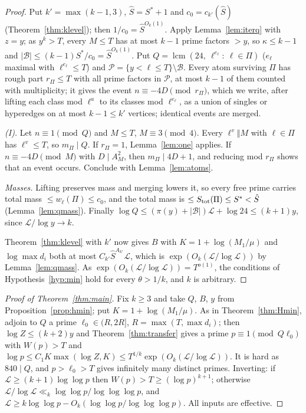 \documentclass[11pt,reqno]{amsart}
\theoremstyle{definition}
\newcommand{\lcm}{\operatorname{lcm}}
\newcommand{\Lc}{\mathcal L}
\begin{document}
\begin{proof}
Put $k'=\max(k-1,3)$, $\hat S=S^*+1$ and $c_0=c_{k'}(\hat S)$
(Theorem~\ref{thm:klevel}); then $1/c_0=\hat S^{O_k(1)}$.  Apply
Lemma~\ref{lem:iterq} with $z=y$; as $y^k>T$, every $M\le T$ has at most $k-1$
prime factors $>y$, so $\kappa\le k-1$ and $|\mathcal B|\le(k-1)S^*/c_0=\hat
S^{O_k(1)}$.  Put $Q=\lcm(24,\ \ell^{e_\ell}:\ \ell\in\Pi)$ ($e_\ell$ maximal with
$\ell^{e_\ell}\le T$) and $\mathcal P=\{y<\ell\le T\}\setminus\mathcal B$.  Every atom
surviving $\Pi$ has rough part $r_\Pi\le T$ with all prime factors in $\mathcal P$,
at most $k-1$ of them counted with multiplicity; it gives the event
$n\equiv-4D\pmod{r_\Pi}$, which we write, after lifting each class mod $\ell^a$ to
its classes mod $\ell^{e_\ell}$, as a union of singles or hyperedges on at most
$k-1\le k'$ vertices; identical events are merged.

\emph{(I).}  Let $n\equiv1\pmod Q$ and $M\le T$, $M\equiv3\pmod 4$.  Every
$\ell^v\Vert M$ with $\ell\in\Pi$ has $\ell^v\le T$, so $m_\Pi\mid Q$.  If $r_\Pi=1$,
Lemma~\ref{lem:one} applies.  If $n\equiv-4D\pmod M$ with $D\mid A_M^2$, then
$m_\Pi\mid4D+1$, and reducing mod $r_\Pi$ shows that an event occurs.
Conclude with Lemma~\ref{lem:atoms}.

\emph{Masses.}  Lifting preserves mass and merging lowers it, so every free
prime carries total mass $\le w_\ell(\Pi)\le c_0$, and the total mass is
$\le S_{\rm tot}(\Pi)\le S^*<\hat S$ (Lemma~\ref{lem:qmass}).  Finally
$\log Q\le(\pi(y)+|\mathcal B|)\Lc+\log24\le(k+1)y$, since $\Lc/\log y\to k$.

Theorem~\ref{thm:klevel} with $k'$ now gives $B$ with $K=1+\log(M_1/\mu)$ and
$\log\max d_i$ both at most $C_{k'}\hat S^{A_{k'}}\Lc$, which is
$\exp(O_k(\Lc/\log\Lc))$ by
Lemma~\ref{lem:qmass}.  As $\exp(O_k(\Lc/\log\Lc))=T^{o(1)}$, the conditions of
Hypothesis~\ref{hyp:min} hold for every $\theta>1/k$, and $k$ is arbitrary.
\end{proof}

\begin{proof}[Proof of Theorem~\ref{thm:main}]
Fix $k\ge3$ and take $Q$, $B$, $y$ from Proposition~\ref{prop:hmin}; put
$K=1+\log(M_1/\mu)$.  As in Theorem~\ref{thm:Hmin}, adjoin to $Q$ a prime
$\ell_0\in(R,2R]$, $R=\max(T,\max d_i)$; then $\log Z\le(k+2)y$ and
Theorem~\ref{thm:transfer} gives a prime $p\equiv1\pmod{Q\ell_0}$ with $W(p)>T$ and
$\log p\le C_1K\max(\log Z,K)\le T^{1/k}\exp(O_k(\Lc/\log\Lc))$.  It is hard as
$840\mid Q$, and $p>\ell_0>T$ gives infinitely many distinct primes.
Inverting: if $\Lc\ge(k+1)\log\log p$ then $W(p)>T\ge(\log p)^{k+1}$;
otherwise $\Lc/\log\Lc\ll_k\log\log p/\log\log\log p$, and
$\Lc\ge k\log\log p-O_k(\log\log p/\log\log\log p)$.  All inputs are effective.
\end{proof}
\end{document}
